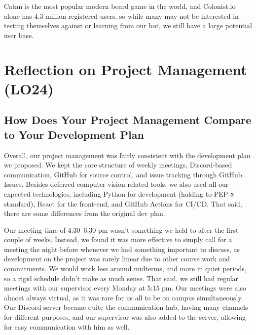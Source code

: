 \documentclass{article}
\begin{document}
Catan is the most popular modern board game in the world, and Colonist.io alone has 4.3 million registered users,
so while many may not be interested in testing themselves against or learning from our bot,
we still have a large potential user base.

\section{Reflection on Project Management (LO24)}


\subsection{How Does Your Project Management Compare to Your Development Plan}


Overall, our project management was fairly consistent with the development plan we proposed.
We kept the core structure of weekly meetings, Discord-based communication, GitHub for source control,
and issue tracking through GitHub Issues.
Besides deferred computer vision-related tools, we also used all our expected technologies, including Python
for development (holding to PEP 8 standard), React for the front-end, and GitHub Actions for CI/CD.
That said, there are some differences from the original dev plan.

Our meeting time of 4:30–6:30 pm wasn't something we held to after the first couple of weeks.
Instead, we found it was more effective to simply call for a meeting the night before whenever we had
something important to discuss, as development on the project was rarely linear due to other course work
and commitments.
We would work less around midterms, and more in quiet periods, so a rigid schedule didn't make as much sense.
That said, we still had regular meetings with our supervisor every Monday at 5:15 pm.
Our meetings were also almost always virtual, as it was rare for us all to be on campus simultaneously.
Our Discord server became quite the communication hub, having many channels for different purposes, and our
supervisor was also added to the server, allowing for easy communication with him as well.
\end{document}

